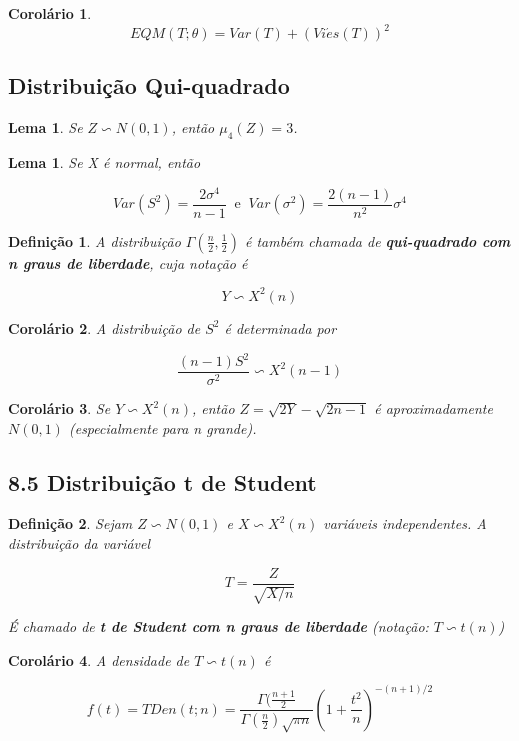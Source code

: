 \documentclass[12pt]{article}
\newtheorem{corollary}{Corolário}[theorem]
\newtheorem{lemma}[theorem]{Lema}
\newtheorem{definition}{Definição}
\begin{document}
\begin{corollary}
    $$EQM(T; \theta) = Var(T) + (Vi\acute{e}s(T))^2$$
\end{corollary}

\subsection*{Distribuição Qui-quadrado}
\begin{lemma}
    Se $Z \backsim N(0, 1)$, então $\mu_4 (Z) = 3$.
\end{lemma}

\begin{lemma}
    Se X é normal, então
    
    $$Var(S^2) = \frac{2 \sigma^4}{n - 1} \ \text{ e } \ Var(\sigma^2) = \frac{2 (n-1)}{n^2}\sigma^4$$
\end{lemma}

\begin{definition}
    A distribuição $\Gamma(\frac{n}{2}, \frac{1}{2})$ é também chamada de \textbf{qui-quadrado com n graus de liberdade}, cuja notação é
    
    $$Y \backsim X^2(n)$$
\end{definition}

\begin{corollary}
    A distribuição de $S^2$ é determinada por
    
    $$\frac{(n-1) S^2}{\sigma^2} \backsim X^2 (n-1)$$
\end{corollary}

\begin{corollary}
    Se $Y \backsim X^2(n)$, então $Z = \sqrt{2 Y} - \sqrt{2 n - 1}$ é aproximadamente $N(0, 1)$ (especialmente para n grande).
\end{corollary}

\subsection*{8.5 Distribuição t de Student}
\begin{definition}
    Sejam $Z \backsim N(0, 1)$ e $X \backsim X^2(n)$ variáveis independentes. A distribuição da variável
    
    $$T = \frac{Z}{\sqrt{X/n}}$$
    
    É chamado de \textbf{t de Student com n graus de liberdade} (notação: $T \backsim t(n)$)
\end{definition}

\begin{corollary}
    A densidade de $T \backsim t(n)$ é
    
    $$f(t) = TDen(t; n) = \frac{\Gamma(\frac{n+1}{2}}{\Gamma (\frac{n}{2}) \sqrt{\pi n}} \left (1 + \frac{t^2}{n} \right) ^{-(n+ 1)/2}$$
\end{corollary}
\end{document}
